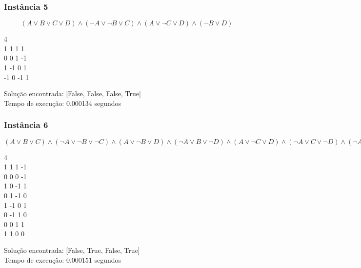 \documentclass[12pt]{article}
\begin{document}

    \subsubsection{Instância 5}
        \[(A \lor B \lor C \lor D) \land (\neg A \lor \neg B \lor C) \land (A \lor \neg C \lor D) \land (\neg B \lor D)\]
        \begin{tcolorbox}[title=Entrada da instância 5, width=\linewidth, fontupper=\ttfamily,  halign=flush left]
            4 \\
            1 1 1 1 \\
            0 0 1 -1 \\
            1 -1 0 1 \\
            -1 0 -1 1 \\
        \end{tcolorbox}
        \begin{tcolorbox}[title=Saída da instância 5, width=\linewidth, fontupper=\ttfamily, halign=flush left]
            Solução encontrada: [False, False, False, True] \\
            Tempo de execução: 0.000134 segundos
        \end{tcolorbox}

    
    \subsubsection{Instância 6}
        \((A \lor B \lor C) \land (\neg A \lor \neg B \lor \neg C) \land (A \lor \neg B \lor D) \land (\neg A \lor B \lor \neg D) \land (A \lor \neg C \lor D) \land (\neg A \lor C \lor \neg D) \land (\neg A \lor \neg B \lor C \lor D) \land (A \lor B \lor \neg C \lor \neg D)\)
        \begin{tcolorbox}[title=Entrada da instância 6, width=\linewidth, fontupper=\ttfamily,  halign=flush left]
            4 \\
            1 1 1 -1 \\
            0 0 0 -1 \\
            1 0 -1 1 \\
            0 1 -1 0 \\
            1 -1 0 1 \\
            0 -1 1 0 \\
            0 0 1 1 \\
            1 1 0 0 \\
        \end{tcolorbox}
        \begin{tcolorbox}[title=Saída da instância 6, width=\linewidth, fontupper=\ttfamily, halign=flush left]
            Solução encontrada: [False, True, False, True] \\
            Tempo de execução: 0.000151 segundos
        \end{tcolorbox}
    
\end{document}

